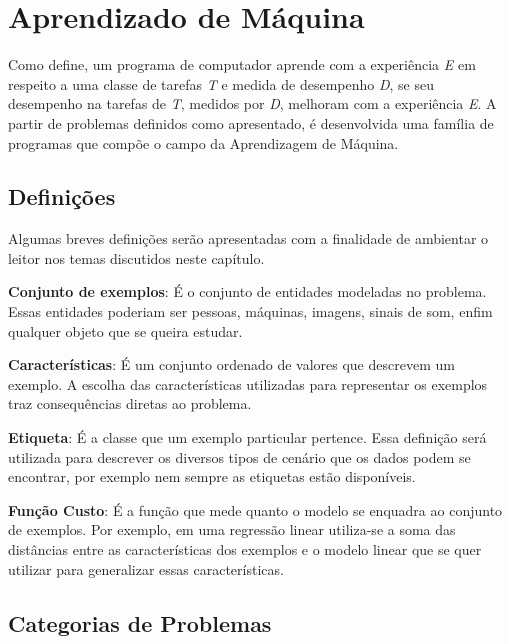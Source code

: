 \chapter{Aprendizado de Máquina} \label{ch:machine}
Como \citet{mitchell} define, um programa de computador aprende com a experiência \textit{E} em respeito a uma classe de tarefas \textit{T} e medida de desempenho \textit{D}, se seu desempenho na tarefas de \textit{T}, medidos por \textit{D}, melhoram com a experiência \textit{E}. A partir de problemas definidos como apresentado, é desenvolvida uma família de programas que compõe o campo da Aprendizagem de Máquina.

\section{Definições}

Algumas breves definições serão apresentadas com a finalidade de ambientar o leitor nos temas discutidos neste capítulo.

\begin{description}
\item \textbf{Conjunto de exemplos}: É o conjunto de entidades modeladas no problema. Essas entidades poderiam ser pessoas, máquinas, imagens, sinais de som, enfim qualquer objeto que se queira estudar.

\item \textbf{Características}: É um conjunto ordenado de valores que descrevem um exemplo. A escolha das características utilizadas para representar os exemplos traz consequências diretas ao problema.

\item \textbf{Etiqueta}: É a classe que um exemplo particular pertence. Essa definição será utilizada para descrever os diversos tipos de cenário que os dados podem se encontrar, por exemplo nem sempre as etiquetas estão disponíveis.

\item \textbf{Função Custo}: É a função que mede quanto o modelo se enquadra ao conjunto de exemplos. Por exemplo, em uma regressão linear utiliza-se a soma das distâncias entre as características dos exemplos e o modelo linear que se quer utilizar para generalizar essas características.
\end{description}


\section{Categorias de Problemas}

